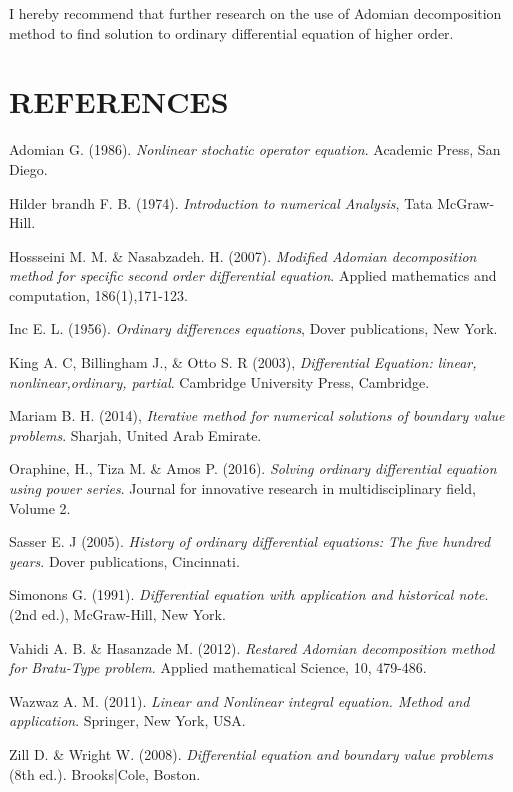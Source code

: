 \documentclass[11pt]{report}
\newcommand{\NI}{\noindent}
\begin{document}
	\NI I hereby recommend that further research on the use of Adomian decomposition method to find solution to ordinary differential equation of higher order.

	
	\chapter*{REFERENCES}
	
	\begin{description}
		\item Adomian G. (1986). \emph{Nonlinear stochatic operator equation}. Academic Press, San Diego.
		
		\item Hilder brandh F. B. (1974). \emph{Introduction to numerical Analysis}, Tata McGraw-Hill.
		
		\item Hossseini M. M. \& Nasabzadeh. H. (2007). \emph{Modified Adomian decomposition method for specific second order differential equation}. Applied mathematics and computation, 186(1),171-123.
		
		\item Inc E. L. (1956). \emph{Ordinary differences equations}, Dover publications, New York.
		
		\item King A. C, Billingham J., \& Otto S. R (2003), \emph{Differential Equation: linear, nonlinear,ordinary, partial}. Cambridge University Press, Cambridge.
		
		\item Mariam B. H. (2014), \emph{Iterative method for numerical solutions of boundary value problems}. Sharjah, United Arab Emirate.
		
		\item Oraphine, H., Tiza M. \& Amos P. (2016). \emph{Solving ordinary differential equation using power series}. Journal for innovative research in multidisciplinary field, Volume 2.
		
		\item Sasser E. J (2005). \emph{History of ordinary differential equations: The five hundred years}. Dover publications, Cincinnati.
		
		\item Simonons G. (1991). \emph{Differential equation with application and historical note}. (2nd ed.), McGraw-Hill, New York. 
		
		\item Vahidi A. B. \& Hasanzade M. (2012). \emph{Restared Adomian decomposition method for Bratu-Type problem}. Applied mathematical Science, 10, 479-486.
		
		\item Wazwaz A. M. (2011). \emph{Linear and Nonlinear integral equation. Method and application}. Springer, New York, USA.
		
		\item Zill D. \& Wright W. (2008). \emph{Differential equation and boundary value problems} (8th ed.). Brooks|Cole, Boston.
	\end{description}
	
\end{document}
